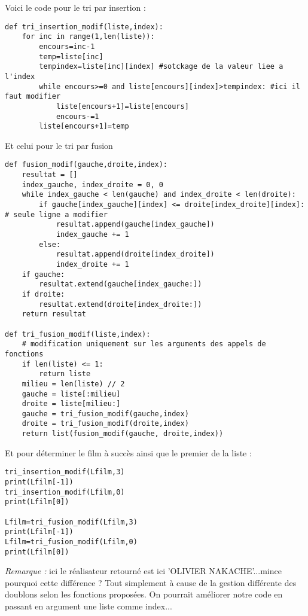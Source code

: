 \ifprof
Voici le code pour le tri par insertion :
\begin{lstlisting}
def tri_insertion_modif(liste,index):
    for inc in range(1,len(liste)):
        encours=inc-1
        temp=liste[inc]
        tempindex=liste[inc][index] #sotckage de la valeur liee a l'index
        while encours>=0 and liste[encours][index]>tempindex: #ici il faut modifier
            liste[encours+1]=liste[encours]
            encours-=1
        liste[encours+1]=temp
\end{lstlisting}
Et celui pour le tri par fusion



\begin{lstlisting}
def fusion_modif(gauche,droite,index):
    resultat = []
    index_gauche, index_droite = 0, 0
    while index_gauche < len(gauche) and index_droite < len(droite):        
        if gauche[index_gauche][index] <= droite[index_droite][index]: # seule ligne a modifier 
            resultat.append(gauche[index_gauche])
            index_gauche += 1
        else:
            resultat.append(droite[index_droite])
            index_droite += 1
    if gauche:
        resultat.extend(gauche[index_gauche:])
    if droite:
        resultat.extend(droite[index_droite:])
    return resultat
    
def tri_fusion_modif(liste,index):
    # modification uniquement sur les arguments des appels de fonctions
    if len(liste) <= 1:
        return liste
    milieu = len(liste) // 2
    gauche = liste[:milieu]
    droite = liste[milieu:]
    gauche = tri_fusion_modif(gauche,index)
    droite = tri_fusion_modif(droite,index)
    return list(fusion_modif(gauche, droite,index))
\end{lstlisting}

Et pour déterminer le film à succès ainsi que le premier de la liste :
\begin{lstlisting}
tri_insertion_modif(Lfilm,3)
print(Lfilm[-1])
tri_insertion_modif(Lfilm,0)
print(Lfilm[0]) 

Lfilm=tri_fusion_modif(Lfilm,3)
print(Lfilm[-1])
Lfilm=tri_fusion_modif(Lfilm,0)
print(Lfilm[0])  
\end{lstlisting}

\textit{Remarque :} ici le réalisateur retourné est ici 'OLIVIER NAKACHE'...mince pourquoi cette différence ? Tout simplement à cause de la gestion différente des doublons selon les fonctions proposées. On pourrait  améliorer notre code en passant en argument une liste comme index...

\else
\fi